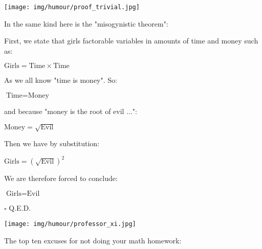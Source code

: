 	\begin{center}
		\texttt{[image: img/humour/proof\_trivial.jpg]}	
	\end{center}
	
	\begin{center}\underline{\hspace{5 cm}}\end{center}	
	
In the same kind here is the "misogynistic theorem":

First, we state that girls factorable variables in amounts of time and money such as:

\begin{center}
$\text{Girls}=\text{Time}\times\text{Time}$
\end{center}

As we all know "time is money". So:

\begin{center}
$\text{Time}=\text{Money}$
\end{center}

and because "money is the root of evil ...":

\begin{center}
$\text{Money}=\sqrt{\text{Evil}}$
\end{center}

Then we have by substitution:

\begin{center}
$\text{Girls}=\left(\sqrt{\text{Evil}}\right)^2$
\end{center}

We are therefore forced to conclude:

\begin{center}
$\text{Girls}=\text{Evil}$
\end{center}

	\begin{flushright}
		$\square$  Q.E.D.
	\end{flushright}
	
	\begin{center}\underline{\hspace{5 cm}}\end{center}
	\begin{center}
		\texttt{[image: img/humour/professor\_xi.jpg]}	
	\end{center}
	
	The top ten excuses for not doing your math homework:
	
